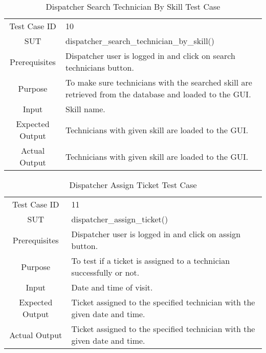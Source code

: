 	\begin{table}[H]
		\centering
		\renewcommand{\arraystretch}{1.5}
		\begin{tabular}[t]{ c  m{10cm} }
			Test Case ID & 10  \\
			SUT & dispatcher\_search\_technician\_by\_skill() \\
			Prerequisites & Dispatcher user is logged in and click on search technicians button. \\
			Purpose & To make sure technicians with the searched skill are retrieved from the database and loaded to the GUI. \\
			Input & Skill name. \\
			Expected Output & Technicians with given skill are loaded to the GUI. \\
			Actual Output & Technicians with given skill are loaded to the GUI. \\
		\end{tabular}
		\caption{Dispatcher Search Technician By Skill Test Case}
		\renewcommand{\arraystretch}{1.0}
	\end{table}
	
	\begin{table}[H]
		\centering
		\renewcommand{\arraystretch}{1.5}
		\begin{tabular}[t]{ c  m{10cm} }
			Test Case ID & 11  \\
			SUT & dispatcher\_assign\_ticket() \\
			Prerequisites & Dispatcher user is logged in and click on assign button. \\
			Purpose & To test if a ticket is assigned to a technician successfully or not. \\
			Input & Date and time of visit. \\
			Expected Output & Ticket assigned to the specified technician with the given date and time. \\
			Actual Output & Ticket assigned to the specified technician with the given date and time. \\
		\end{tabular}
		\caption{Dispatcher Assign Ticket Test Case}
		\renewcommand{\arraystretch}{1.0}
	\end{table}
	
